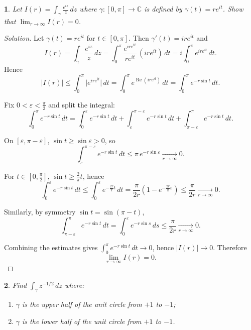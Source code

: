 \documentclass[12pt, a4paper]{report}
\theoremstyle{spaced}
\newtheorem{exercise}{}
\newcommand{\setexercise}[1]{\setcounter{exercise}{#1-1}}
\begin{document}
\setexercise{12}
\begin{exercise}
	Let $I(r)=\displaystyle\int_{\gamma}\frac{e^{iz}}{z}\,dz$ where $\gamma:[0,\pi]\to\mathbb{C}$ is defined by $\gamma(t)=re^{it}$. Show that $\displaystyle\lim_{r\to\infty} I(r)=0$.
\end{exercise}


\begin{proof}[Solution]
	Let $\gamma(t)=r e^{it}$ for $t\in[0,\pi]$. Then $\gamma'(t)=i r e^{it}$ and
	\[
		I(r)=\int_{\gamma}\frac{e^{iz}}{z}\,dz
		=\int_0^\pi \frac{e^{i r e^{it}}}{r e^{it}}\,(i r e^{it})\,dt
		= i\int_0^\pi e^{i r e^{it}}\,dt.
	\]
	Hence
	\[
		|I(r)|\le \int_0^\pi \bigl|e^{i r e^{it}}\bigr|\,dt
		=\int_0^\pi e^{\operatorname{Re}(i r e^{it})}\,dt
		=\int_0^\pi e^{-r\sin t}\,dt.
	\]

	Fix $0<\varepsilon<\frac{\pi}{2}$ and split the integral:
	\[
		\int_0^\pi e^{-r\sin t}\,dt
		=\int_0^\varepsilon e^{-r\sin t}\,dt
		+\int_\varepsilon^{\pi-\varepsilon} e^{-r\sin t}\,dt
		+\int_{\pi-\varepsilon}^{\pi} e^{-r\sin t}\,dt.
	\]

	On $[\varepsilon,\pi-\varepsilon]$, $\sin t\ge \sin\varepsilon>0$, so
	\[
		\int_\varepsilon^{\pi-\varepsilon} e^{-r\sin t}\,dt
		\le \pi\, e^{-r\sin\varepsilon}
		\xrightarrow[r\to\infty]{}0.
	\]

	For $t\in[0,\frac{\pi}{2}]$, $\sin t\ge \frac{2}{\pi}t$, hence
	\[
		\int_0^\varepsilon e^{-r\sin t}\,dt
		\le \int_0^\varepsilon e^{-\frac{2r}{\pi}t}\,dt
		= \frac{\pi}{2r}\!\left(1-e^{-\frac{2r}{\pi}\varepsilon}\right)
		\le \frac{\pi}{2r}
		\xrightarrow[r\to\infty]{}0.
	\]

	Similarly, by symmetry $\sin t=\sin(\pi-t)$,
	\[
		\int_{\pi-\varepsilon}^{\pi} e^{-r\sin t}\,dt
		= \int_0^\varepsilon e^{-r\sin s}\,ds
		\le \frac{\pi}{2r}
		\xrightarrow[r\to\infty]{}0.
	\]

	Combining the estimates gives $\int_0^\pi e^{-r\sin t}\,dt \to 0$, hence
	$|I(r)|\to 0$. Therefore
	\[
		\lim_{r\to\infty} I(r)=0.
	\]
\end{proof}

\setexercise{13}
\begin{exercise}
	Find $\displaystyle\int_{\gamma} z^{-1/2}\,dz$ where:
	\begin{enumerate}\itemsep0pt
		\item[(a)] $\gamma$ is the upper half of the unit circle from $+1$ to $-1$;
		\item[(b)] $\gamma$ is the lower half of the unit circle from $+1$ to $-1$.
	\end{enumerate}
\end{exercise}
\end{document}
